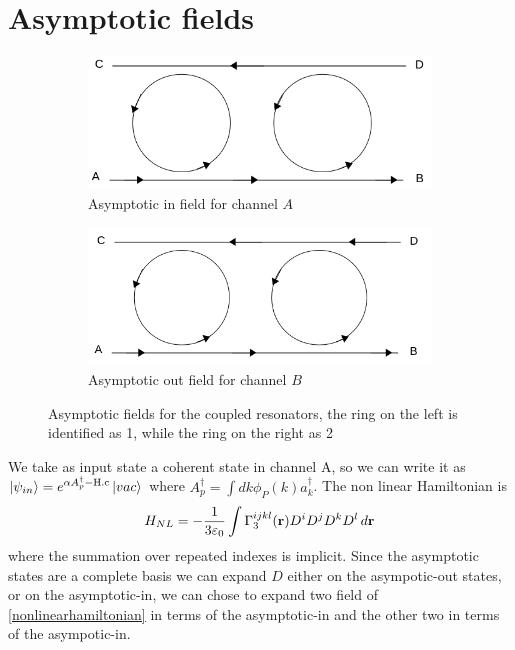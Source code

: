 \section{Asymptotic fields}
\begin{figure}[H]
\centering
\begin{subfigure}{0.5\textwidth}
\centering
\includegraphics[width = \textwidth]{img/Asyina}
\caption{Asymptotic in field for channel $A$}
\end{subfigure}%
\begin{subfigure}{0.5\textwidth}
\includegraphics[width = \textwidth]{img/Asyoutb}
\caption{Asymptotic out field for channel $B$}
\end{subfigure}
\caption{Asymptotic fields for the coupled resonators, the ring on the left is identified as 1, while the ring on the right as 2}\label{asyfields}
\end{figure}
We take as input state a coherent state in channel A, so we can write it as $\ket{\psi_{in}} = e^{\alpha A_p^\dagger - \text{H.c}}\ket{vac}$ where $A_p^\dagger = \int dk \phi_P(k) a_k^\dagger$. The non linear Hamiltonian is \cite{Sipe2004}
\begin{equation}\label{nonlinearhamiltonian}H_{NL} = -\frac{1}{3\varepsilon_0}\int\Gamma^{ijkl}_3(\mathbf{r})D^iD^jD^kD^l\,d\mathbf{r}\end{equation}
where the summation over repeated indexes is implicit. Since the asymptotic states are a complete basis we can expand $D$ either on the asympotic-out states, or on the asymptotic-in, we can chose to expand two field of \eqref{nonlinearhamiltonian} in terms of the asymptotic-in and the other two in terms of the asympotic-in.
